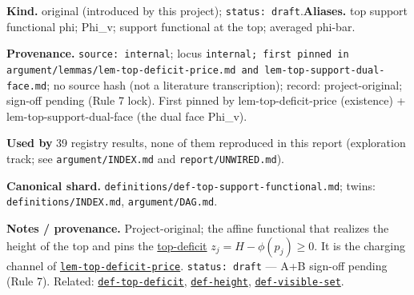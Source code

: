 \begin{defnote}
\textbf{Kind.} original (introduced by this project); \texttt{status: draft}.\quad\textbf{Aliases.} top support functional phi; Phi\_v; support functional at the top; averaged phi-bar.
\par
\textbf{Provenance.} \texttt{source: internal}; locus \texttt{internal;\allowbreak{} first pinned in argument/\allowbreak{}lemmas/\allowbreak{}lem-\allowbreak{}top-\allowbreak{}deficit-\allowbreak{}price.\allowbreak{}md and lem-\allowbreak{}top-\allowbreak{}support-\allowbreak{}dual-\allowbreak{}face.\allowbreak{}md}; no source hash (not a literature transcription); record: project-\allowbreak{}original;\allowbreak{} sign-\allowbreak{}off pending (Rule 7 lock).\allowbreak{} First pinned by lem-\allowbreak{}top-\allowbreak{}deficit-\allowbreak{}price (existence) + lem-\allowbreak{}top-\allowbreak{}support-\allowbreak{}dual-\allowbreak{}face (the dual face Phi\_v).
\par
\textbf{Used by} 39 registry results, none of them reproduced in this report (exploration track; see \texttt{argument/INDEX.md} and \texttt{report/UNWIRED.md}).
\par
\textbf{Canonical shard.} \texttt{definitions/\allowbreak{}def-\allowbreak{}top-\allowbreak{}support-\allowbreak{}functional.\allowbreak{}md}; twins: \texttt{definitions/INDEX.md}, \texttt{argument/DAG.md}.
\par
\textbf{Notes / provenance.} Project-original; the affine functional that realizes the height of the top
and pins the \hyperref[def:top-deficit]{top-deficit} $z_j=H-\phi(p_j)\ge0$. It is the charging channel of
\hyperlink{dag:lem-top-deficit-price}{\texttt{lem-\allowbreak{}top-\allowbreak{}deficit-\allowbreak{}price}}. \texttt{status:\allowbreak{} draft} --- A+B sign-off pending (Rule 7). Related:
\hyperref[def:top-deficit]{\texttt{def-\allowbreak{}top-\allowbreak{}deficit}}, \hyperref[def:height]{\texttt{def-\allowbreak{}height}}, \hyperref[def:visible-set]{\texttt{def-\allowbreak{}visible-\allowbreak{}set}}.
\end{defnote}


